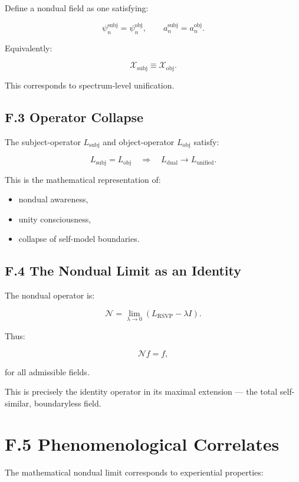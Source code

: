 \documentclass[12pt]{article}
\begin{document}
Define a nondual field as one satisfying:

\[
\psi_n^{\mathrm{subj}} = \psi_n^{\mathrm{obj}},
\qquad
a_n^{\mathrm{subj}} = a_n^{\mathrm{obj}}.
\]

Equivalently:

\[
\mathcal{X}_{\mathrm{subj}} \equiv \mathcal{X}_{\mathrm{obj}}.
\]

This corresponds to spectrum-level unification.

\subsection*{F.3 Operator Collapse}

The subject-operator $L_{\mathrm{subj}}$ and object-operator $L_{\mathrm{obj}}$
satisfy:

\[
L_{\mathrm{subj}} = L_{\mathrm{obj}}
\quad\Rightarrow\quad
L_{\mathrm{dual}} \to L_{\mathrm{unified}}.
\]

This is the mathematical representation of:

\begin{itemize}
\item nondual awareness,
\item unity consciousness,
\item collapse of self-model boundaries.
\end{itemize}


\subsection*{F.4 The Nondual Limit as an Identity}

The nondual operator is:

\[
\mathcal{N}
=
\lim_{\lambda \to 0}
(L_{\text{RSVP}} - \lambda I).
\]

Thus:

\[
\mathcal{N} f = f,
\]

for all admissible fields.

This is precisely the identity operator in its maximal extension — the total
self-similar, boundaryless field.

\section*{F.5 Phenomenological Correlates}

The mathematical nondual limit corresponds to experiential properties:
\end{document}
